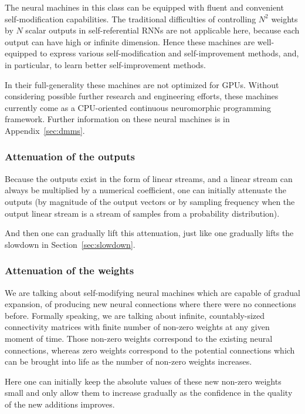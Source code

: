 \documentclass{article}
\begin{document}
The neural machines in this class can be equipped with fluent and convenient self-modification capabilities. The traditional
difficulties of controlling $N^2$ weights by $N$ scalar outputs in self-referential RNNs are not applicable here, because each
output can have high or infinite dimension. Hence these machines are well-equipped to express various self-modification and
self-improvement methods, and, in particular, to learn better self-improvement methods.

In their full-generality these machines are not optimized for GPUs. Without considering possible further research and engineering efforts,
these machines currently come as a CPU-oriented continuous neuromorphic programming framework. Further information on these neural machines
is in Appendix~\ref{sec:dmms}.

\subsubsection{Attenuation of the outputs}

Because the outputs exist in the form of linear streams, and a linear stream can always be multiplied by a numerical coefficient,
one can initially attenuate the outputs (by magnitude of the output vectors or by sampling frequency when the output linear stream is a stream of
samples from a probability distribution).

And then one can gradually lift this attenuation, just like one gradually lifts the slowdown in Section~\ref{sec:slowdown}.

\subsubsection{Attenuation of the weights}

We are talking about self-modifying neural machines which are capable of gradual expansion, of producing new neural connections
where there were no connections before. Formally speaking, we are talking about infinite, countably-sized connectivity matrices
with finite number of non-zero weights at any given moment of time. Those non-zero weights correspond to the existing
neural connections, whereas zero weights correspond to the potential connections which can be brought into life as the
number of non-zero weights increases.

Here one can initially keep the absolute values of these new non-zero weights small and only allow them to increase gradually as the confidence in the quality
of the new additions improves.
\end{document}
